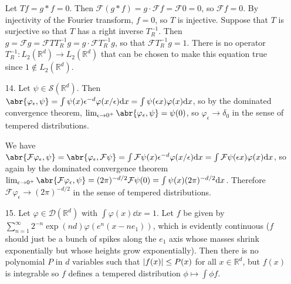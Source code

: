\documentclass[11pt,leqno]{article}
\theoremstyle{plain}
\theoremstyle{definition}
\numberwithin{equation}{section}
\numberwithin{lem}{section}
\begin{document}
\begin{enumerate}
    Let $Tf = g\ast f = 0$. Then $\mathcal F(g\ast f) = g\cdot\mathcal Ff = \mathcal F0 = 0$, so $\mathcal Ff = 0$. By injectivity of the Fourier transform, $f = 0$, so $T$ is injective. Suppose that $T$ is surjective so that $T$ has a right inverse $T_R^{-1}$. Then $g = \mathcal Fg = \mathcal FTT_R^{-1}g = g\cdot\mathcal FT_R^{-1}g$, so that $\mathcal FT_R^{-1}g = 1$. There is no operator $T_R^{-1}\colon L_2(\mathbb R^d)\to L_2(\mathbb R^d)$ that can be chosen to make this equation true since $1\not\in L_2(\mathbb R^d)$.
    \item[14.] Let $\psi\in \mathcal S(\mathbb R^d)$. Then $\abr{\varphi_\epsilon,\psi} = \int\psi(x)\epsilon^{-d}\varphi(x/\epsilon)\dd x = \int\psi(\epsilon x)\varphi(x)\dd x$, so by the dominated convergence theorem, $\lim_{\epsilon\to 0^+}\abr{\varphi_\epsilon, \psi} = \psi(0)$, so $\varphi_\epsilon\to \delta_0$ in the sense of tempered distributions.
    
    We have $\abr{\mathcal F\varphi_\epsilon,\psi} = \abr{\varphi_\epsilon,\mathcal F\psi} = \int\mathcal F\psi(x)\epsilon^{-d}\varphi(x/\epsilon)\dd x = \int\mathcal F\psi(\epsilon x)\varphi(x)\dd x$, so again by the dominated convergence theorem $\lim_{\epsilon\to 0^+}\abr{\mathcal F\varphi_\epsilon,\psi}= (2\pi)^{-d/2}\mathcal F\psi(0) = \int\psi(x)(2\pi)^{-d/2}\dd x$. Therefore $\mathcal F\varphi_\epsilon\to (2\pi)^{-d/2}$ in the sense of tempered distributions. 
    \item[15.] Let $\varphi\in \mathcal D(\mathbb R^d)$ with $\int\varphi(x)\dd x = 1$. Let $f$ be given by $\sum_{n=1}^\infty 2^{-n}\exp(nd)\varphi(e^n(x-ne_1))$, which is evidently continuous ($f$ should just be a bunch of spikes along the $e_1$ axis whose masses shrink exponentially but whose heights grow exponentially). Then there is no polynomial $P$ in $d$ variables such that $\abs{f(x)}\leq P(x)$ for all $x\in \mathbb R^d$, but $f(x)$ is integrable so $f$ defines a tempered distribution $\phi\mapsto \int \phi f$.
\end{enumerate}
\end{document}

